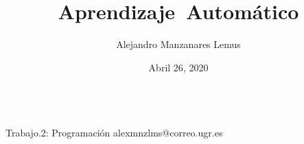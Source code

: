\documentclass[10pt]{report}
\author{Alejandro Manzanares Lemus}
\title{Aprendizaje\ Automático}
\date{Abril 26, 2020}
\begin{document}
\aqtitlepage[nolicense]
				{}
            {\\ Trabajo.2: Programación}
            {alexmnzlms@correo.ugr.es}

\tableofcontents


\end{document}
